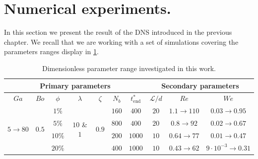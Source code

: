 \section{Numerical experiments. }

In this section we present the result of the DNS introduced in the previous chapter. 
We recall that we are working with a set of simulations covering the parameters ranges display in \ref{tab:simulations_recall}. 
\begin{table}[h!]
    \centering
    \caption{Dimensionless parameter range investigated in this work.}
    \begin{tabular}{|ccccccc|ccc|}
        \hline
        \multicolumn{7}{|c}{Primary parameters} & \multicolumn{3}{||c|}{Secondary parameters}\\ \hline
        \multicolumn{1}{|c|}{$Ga$}                               & \multicolumn{1}{c|}{$Bo$}                   & \multicolumn{1}{c|}{$\phi$} & \multicolumn{1}{c|}{$\lambda$}                    & \multicolumn{1}{c|}{$\zeta$}                & \multicolumn{1}{c|}{$N_b$} & $t^*_\text{end}$ & \multicolumn{1}{||c|}{$\mathcal{L}/d$} & \multicolumn{1}{c|}{$Re$}  & $We$   \\ \hline
        \multicolumn{1}{|c|}{\multirow{4}{*}{$5\rightarrow 80$}} & \multicolumn{1}{c|}{\multirow{4}{*}{$0.5$}} & \multicolumn{1}{c|}{$1\%$}  & \multicolumn{1}{c|}{\multirow{4}{*}{$10$ \& $1$}} & \multicolumn{1}{c|}{\multirow{4}{*}{$0.9$}} & \multicolumn{1}{c|}{$160$} & $400$           & \multicolumn{1}{||c|}{$20$}            & \multicolumn{1}{c|}{$1.1\to 110$} & {$0.03\to 0.95$} \\ 
        \multicolumn{1}{|c|}{}                                   & \multicolumn{1}{c|}{}                       & \multicolumn{1}{c|}{$5\%$}  & \multicolumn{1}{c|}{}                             & \multicolumn{1}{c|}{}                       & \multicolumn{1}{c|}{$800$} & $400$           & \multicolumn{1}{||c|}{$20$}            & \multicolumn{1}{c|}{$0.8\to 92$} &  {$0.02\to 0.67$}\\ 
        \multicolumn{1}{|c|}{}                                   & \multicolumn{1}{c|}{}                       & \multicolumn{1}{c|}{$10\%$} & \multicolumn{1}{c|}{}                             & \multicolumn{1}{c|}{}                       & \multicolumn{1}{c|}{$200$} & $1000$           & \multicolumn{1}{||c|}{$10$}            & \multicolumn{1}{c|}{$0.64\to 77$}&  {$0.01\to 0.47$}\\ 
        \multicolumn{1}{|c|}{}                                   & \multicolumn{1}{c|}{}                       & \multicolumn{1}{c|}{$20\%$} & \multicolumn{1}{c|}{}                             & \multicolumn{1}{c|}{}                       & \multicolumn{1}{c|}{$400$} & $1000$           & \multicolumn{1}{||c|}{$10$}            & \multicolumn{1}{c|}{$0.43\to 62$}&  {$9\cdot 10^{-3}\to 0.31$}\\ \hline
        \end{tabular}
    \label{tab:simulations_recall}
\end{table}
